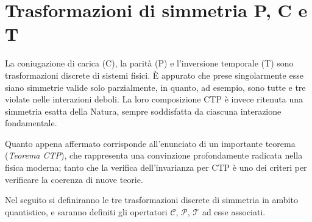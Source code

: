 

\chapter{Trasformazioni di simmetria P, C e T}
\noindent
La coniugazione di carica (C), la parità (P) e l'inversione temporale (T) sono  trasformazioni discrete di sistemi fisici.
È appurato che prese singolarmente esse siano simmetrie valide solo parzialmente, in quanto, ad esempio, sono tutte e tre violate nelle interazioni deboli.
La loro composizione CTP è invece ritenuta una simmetria esatta della Natura, sempre soddisfatta da ciascuna interazione fondamentale. 

Quanto appena affermato corrisponde all'enunciato di un importante teorema (\emph{Teorema CTP}), che rappresenta una convinzione profondamente 
radicata nella fisica moderna; tanto che la verifica dell'invarianza per CTP è uno dei criteri per verificare la coerenza di nuove teorie.

Nel seguito si definiranno le tre trasformazioni discrete di simmetria in ambito quantistico, 
e saranno definiti gli opertatori $\mathscr{C}$, $\mathscr{P}$, $\mathscr{T}$ ad esse associati.


